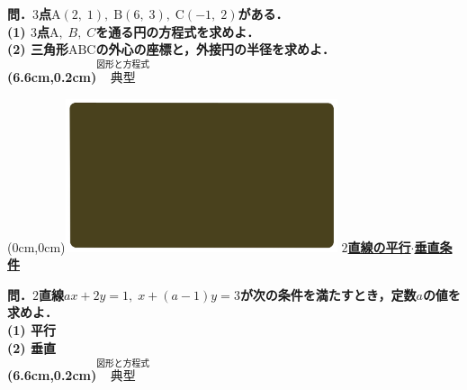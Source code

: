 \documentclass[10pt,
fleqn,
dvipdfmx,
uplatex
]{jsarticle}
\begin{document}
\large 
\bf\boldmath 問．$3$点$\text{A}\left(2,\;1\right),\;\text{B}\left(6,\;3\right),\;\text{C}\left(-1,\;2\right)$がある．\\
(1)  $3$点$\text{A},\;B,\;C$を通る円の方程式を求めよ．\\
(2)  三角形$\text{ABC}$の外心の座標と，外接円の半径を求めよ．\\

\at(6.6cm,0.2cm){\small\color{bradorange}$\overset{\text{図形と方程式}}{\text{典型}}$}


\newpage



\at(0cm,0cm){\includegraphics[width=8cm,bb=0 0 1920 1080]{./youtube/thumbnails/templates/smart_background/図形と方程式.jpeg}}
{\color{orange}\bf\boldmath\LARGE\underline{$2$直線の平行$\cdot$垂直条件}}\vspace{0.3zw}

\Large 
\bf\boldmath 問．$2$直線$ax+2y=1,\;x+\left(a-1\right)y=3$が次の条件を満たすとき，定数$a$の値を求めよ．\\
(1)  平行\\
(2)  垂直\\

\at(6.6cm,0.2cm){\small\color{bradorange}$\overset{\text{図形と方程式}}{\text{典型}}$}
\end{document}
